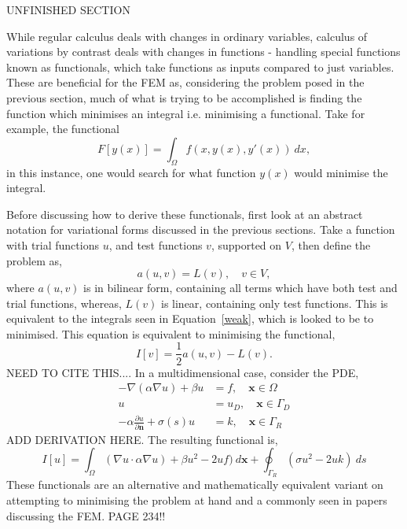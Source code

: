 UNFINISHED SECTION

While regular calculus deals with changes in ordinary variables, calculus of variations by contrast deals with changes in functions - handling special functions  known as functionals, which take functions as inputs compared to just variables. These are beneficial for the FEM as, considering the problem posed in the previous section, much of what is trying to be accomplished is finding the function which minimises an integral i.e. minimising a functional. Take for example, the functional 
\begin{equation}
	F[y(x)] = \int_\Omega f(x, y(x),y'(x))~dx,
\end{equation}
in this instance, one would search for what function $y(x)$ would minimise the integral.

Before discussing how to derive these functionals, first look at an abstract notation for variational forms discussed in the previous sections. Take a function with trial functions $u$, and test functions $v$, supported on $V$, then define the problem as,
\begin{equation}
	a(u,v) = L(v),\quad v\in V,
\end{equation}
where $a(u,v)$ is in bilinear form, containing all terms which have both test and trial functions, whereas, $L(v)$ is linear, containing only test functions. This is equivalent to the integrals seen in Equation~\eqref{weak}, which is looked to be to minimised. This equation is equivalent to minimising the functional,
\begin{equation}
	I[v] = \frac{1}{2}a(u,v) - L(v). 
\end{equation}
NEED TO CITE THIS....
In a multidimensional case, consider the PDE,
\begin{align}
	-\nabla(\alpha\nabla u) + \beta u &= f,\quad \mathbf{x} \in \Omega\\
	u &= u_D,\quad \mathbf{x} \in \Gamma_D\\
	-\alpha \frac{\partial u}{\partial \mathbf{n}} + \sigma(s) u &= k,\quad \mathbf{x}\in \Gamma_R	
\end{align}
ADD DERIVATION HERE.
The resulting functional is,
\begin{equation}
	I[u] = \int_\Omega (\nabla u\cdot \alpha \nabla u) + \beta u^2 - 2 u f)~d\mathbf{x} + \oint_{\Gamma_R} (\sigma u^2 - 2 u k)~ds
\end{equation}
These functionals are an alternative and mathematically equivalent variant on attempting to minimising the problem at hand and a commonly seen in papers discussing the FEM. 
PAGE 234!!

